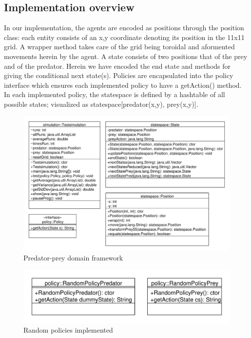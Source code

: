 \documentclass[paper=a4, fontsize=11pt]{scrartcl}
\numberwithin{equation}{section}		%
\numberwithin{figure}{section}			%
\numberwithin{table}{section}				%
\begin{document}
\subsection{Implementation overview}
In our implementation, the agents are encoded as positions through the position class: each entity consists of an x,y coordinate denoting its position in the 11x11 grid. A wrapper method takes care of the grid being toroidal and aformented movements herein by the agent. A state consists of two positions that of the prey and of the predator. Herein we have encoded the end state and methods for giving the conditional next state(s). Policies are encapsulated into the policy interface which ensures each implemented policy to have a getAction() method. In each implemented policy, the statespace is defined by a hashtable of all possible states; visualized as statespace[predator(x,y), prey(x,y)].
\begin{figure}[H] \centering
\includegraphics[scale=0.6]{uml_general.pdf}
\caption{Predator-prey domain framework} \label{Predator-prey domain framework}
\end{figure}
\begin{figure}[H] \centering
\includegraphics[scale=0.6]{uml_policies1.pdf}
\caption{Random policies implemented} \label{Policies1}
\end{figure}
\end{document}
